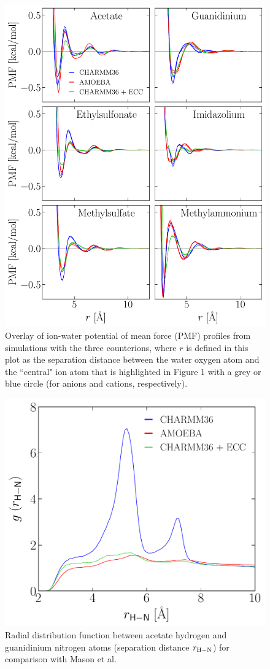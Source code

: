 \documentclass[journal=jacsat,articletitle=true,manuscript=suppinfo,layout=onecolumn]{achemso}
\begin{document}
    \begin{figure}[H]
    \begin{center}
        \includegraphics[width=0.9\columnwidth]{images/charmm_comparison_water_overlay_pmf.pdf}
        \caption{Overlay of ion-water potential of mean force (PMF) profiles from simulations with the three counterions, where $r$ is defined in this plot as the separation distance between the water oxygen atom and the ``central" ion atom that is highlighted in Figure 1 with a grey or blue circle (for anions and cations, respectively).}
        \label{fig:water_pmfs}
    \end{center}
    \end{figure}

    \begin{figure}[H]
    \begin{center}
        \includegraphics[width=0.6\columnwidth]{images/acet_H_guan_N_gr.pdf}
        \caption{Radial distribution function between acetate hydrogen and guanidinium nitrogen atoms (separation distance $r_{\rm{H-N}}$) for comparison with Mason et al.\cite{Mason2019a}}
        \label{fig:gr_out_of_plane}
    \end{center}
    \end{figure}
\end{document}

